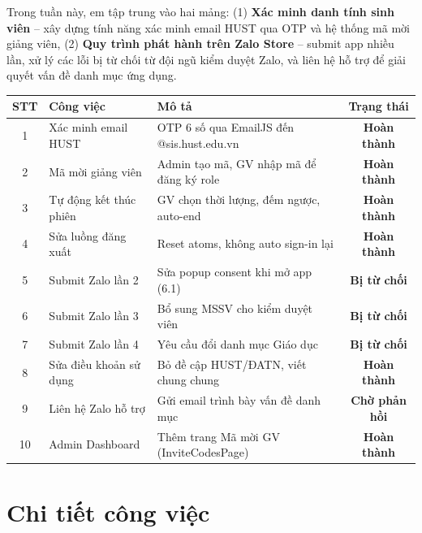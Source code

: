 \documentclass{article}
\begin{document}
Trong tuần này, em tập trung vào hai mảng: (1) \textbf{Xác minh danh tính sinh viên} -- xây dựng tính năng xác minh email HUST qua OTP và hệ thống mã mời giảng viên, (2) \textbf{Quy trình phát hành trên Zalo Store} -- submit app nhiều lần, xử lý các lỗi bị từ chối từ đội ngũ kiểm duyệt Zalo, và liên hệ hỗ trợ để giải quyết vấn đề danh mục ứng dụng.

\begin{center}
\begin{tabularx}{\textwidth}{@{}c l X c@{}}
\toprule
\textbf{STT} & \textbf{Công việc} & \textbf{Mô tả} & \textbf{Trạng thái} \\
\midrule
1 & Xác minh email HUST & OTP 6 số qua EmailJS đến @sis.hust.edu.vn & \textcolor{statusgreen}{\textbf{Hoàn thành}} \\
2 & Mã mời giảng viên & Admin tạo mã, GV nhập mã để đăng ký role & \textcolor{statusgreen}{\textbf{Hoàn thành}} \\
3 & Tự động kết thúc phiên & GV chọn thời lượng, đếm ngược, auto-end & \textcolor{statusgreen}{\textbf{Hoàn thành}} \\
4 & Sửa luồng đăng xuất & Reset atoms, không auto sign-in lại & \textcolor{statusgreen}{\textbf{Hoàn thành}} \\
5 & Submit Zalo lần 2 & Sửa popup consent khi mở app (6.1) & \textcolor{statusred}{\textbf{Bị từ chối}} \\
6 & Submit Zalo lần 3 & Bổ sung MSSV cho kiểm duyệt viên & \textcolor{statusred}{\textbf{Bị từ chối}} \\
7 & Submit Zalo lần 4 & Yêu cầu đổi danh mục Giáo dục & \textcolor{statusred}{\textbf{Bị từ chối}} \\
8 & Sửa điều khoản sử dụng & Bỏ đề cập HUST/ĐATN, viết chung chung & \textcolor{statusgreen}{\textbf{Hoàn thành}} \\
9 & Liên hệ Zalo hỗ trợ & Gửi email trình bày vấn đề danh mục & \textcolor{statusamber}{\textbf{Chờ phản hồi}} \\
10 & Admin Dashboard & Thêm trang Mã mời GV (InviteCodesPage) & \textcolor{statusgreen}{\textbf{Hoàn thành}} \\
\bottomrule
\end{tabularx}
\end{center}

\section{Chi tiết công việc}
\end{document}
